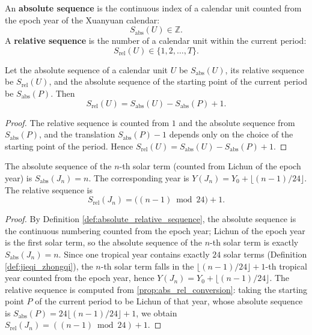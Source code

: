 \begin{definition}\label{def:absolute_relative_sequence}
An \textbf{absolute sequence} is the continuous index of a calendar unit counted from the epoch year of the Xuanyuan calendar:
\[
S_{\text{abs}}(U)\in\mathbb Z.
\]
A \textbf{relative sequence} is the number of a calendar unit within the current period:
\[
S_{\text{rel}}(U)\in\{1,2,\dots,T\}.
\]
\end{definition}

\begin{proposition}\label{prop:abs_rel_conversion}
Let the absolute sequence of a calendar unit \(U\) be \(S_{\text{abs}}(U)\), its relative sequence be \(S_{\text{rel}}(U)\), and the absolute sequence of the starting point of the current period be \(S_{\text{abs}}(P)\). Then
\[
S_{\text{rel}}(U)=S_{\text{abs}}(U)-S_{\text{abs}}(P)+1.
\]
\end{proposition}

\begin{proof}
The relative sequence is counted from \(1\) and the absolute sequence from \(S_{\text{abs}}(P)\), and the translation \(S_{\text{abs}}(P)-1\) depends only on the choice of the starting point of the period. Hence \(S_{\text{rel}}(U)=S_{\text{abs}}(U)-S_{\text{abs}}(P)+1\).
\end{proof}

\begin{proposition}\label{prop:jieqi_absolute_sequence}
The absolute sequence of the \(n\)-th solar term (counted from Lichun of the epoch year) is \(S_{\text{abs}}(J_n)=n\). The corresponding year is \(Y(J_n)=Y_0+\lfloor (n-1)/24\rfloor\). The relative sequence is
\[
S_{\text{rel}}(J_n)=\bigl((n-1)\bmod 24\bigr)+1.
\]
\end{proposition}

\begin{proof}
By Definition \ref{def:absolute_relative_sequence}, the absolute sequence is the continuous numbering counted from the epoch year; Lichun of the epoch year is the first solar term, so the absolute sequence of the \(n\)-th solar term is exactly \(S_{\text{abs}}(J_n)=n\). Since one tropical year contains exactly \(24\) solar terms (Definition \ref{def:jieqi_zhongqi}), the \(n\)-th solar term falls in the \(\lfloor (n-1)/24\rfloor+1\)-th tropical year counted from the epoch year, hence \(Y(J_n)=Y_0+\lfloor (n-1)/24\rfloor\). The relative sequence is computed from \cref{prop:abs_rel_conversion}: taking the starting point \(P\) of the current period to be Lichun of that year, whose absolute sequence is \(S_{\text{abs}}(P)=24\lfloor (n-1)/24\rfloor+1\), we obtain \(S_{\text{rel}}(J_n)=((n-1)\bmod 24)+1\).
\end{proof}

